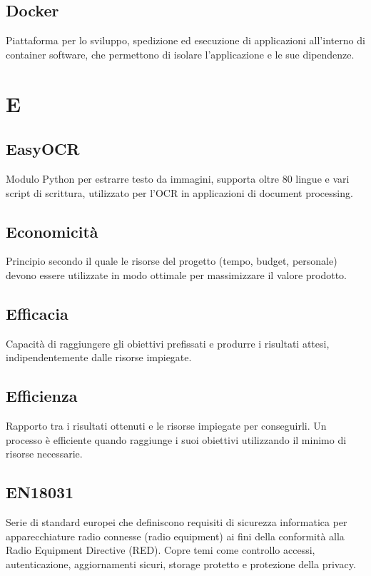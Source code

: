 \documentclass[a4paper,11pt]{article}
\begin{document}
\subsection{Docker}
Piattaforma per lo sviluppo, spedizione ed esecuzione di applicazioni all'interno di container software, che permettono di isolare l'applicazione e le sue dipendenze.

\newpage
\section{E}

\subsection{EasyOCR}
Modulo Python per estrarre testo da immagini, supporta oltre 80 lingue e vari script di scrittura, utilizzato per l'OCR in applicazioni di document processing.

\subsection{Economicità}
Principio secondo il quale le risorse del progetto (tempo, budget, personale) devono essere utilizzate in modo ottimale per massimizzare il valore prodotto.

\subsection{Efficacia}
Capacità di raggiungere gli obiettivi prefissati e produrre i risultati attesi, indipendentemente dalle risorse impiegate.

\subsection{Efficienza}
Rapporto tra i risultati ottenuti e le risorse impiegate per conseguirli. Un processo è efficiente quando raggiunge i suoi obiettivi utilizzando il minimo di risorse necessarie.

\subsection{EN18031}
Serie di standard europei che definiscono requisiti di sicurezza informatica per apparecchiature radio connesse (radio equipment) ai fini della conformità alla Radio Equipment Directive (RED). Copre temi come controllo accessi, autenticazione, aggiornamenti sicuri, storage protetto e protezione della privacy.
\end{document}
